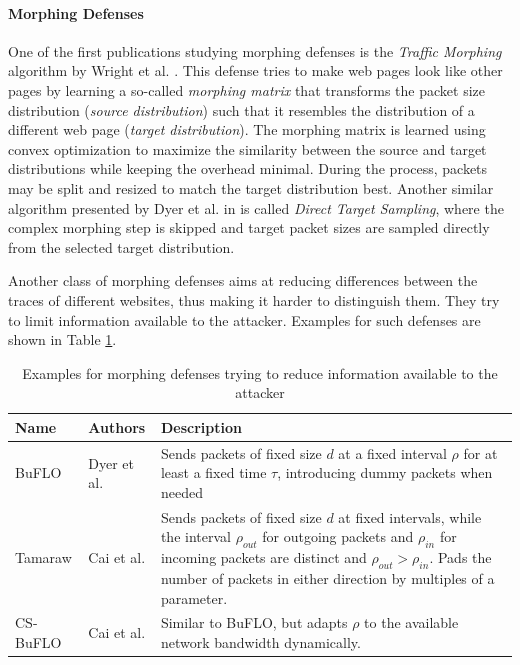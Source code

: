 \documentclass[
	ruledheaders=chapter,
	class=report,
	thesis={type=master, department=inf},
	accentcolor=1c,
	custommargins=true,
	marginpar=false,
	parskip=half-,
	fontsize=11pt,
]{tudapub}
\begin{document}
	\paragraph{Morphing Defenses} One of the first publications studying morphing defenses is the \textit{Traffic Morphing} algorithm by Wright et al. \cite{Wright2009}. This defense tries to make web pages look like other pages by learning a so-called \textit{morphing matrix} that transforms the packet size distribution (\textit{source distribution}) such that it resembles the distribution of a different web page (\textit{target distribution}). The morphing matrix is learned using convex optimization to maximize the similarity between the source and target distributions while keeping the overhead minimal. During the process, packets may be split and resized to match the target distribution best. Another similar algorithm presented by Dyer et al. in \cite{Dyer2012} is called \textit{Direct Target Sampling}, where the complex morphing step is skipped and target packet sizes are sampled directly from the selected target distribution.
	
	Another class of morphing defenses aims at reducing differences between the traces of different websites, thus making it harder to distinguish them. They try to limit information available to the attacker. Examples for such defenses are shown in Table \ref{tbl:morphing}.
	
	\begin{table}
		\centering
		\begin{tabularx}{\textwidth}{|l|l|X|}
			\hline \textbf{Name} & \textbf{Authors} & \textbf{Description} \\
			\hline BuFLO & Dyer et al. \cite{Dyer2012} & Sends packets of fixed size $d$ at a fixed interval $\rho$ for at least a fixed time $\tau$, introducing dummy packets when needed \\
			\hline Tamaraw & Cai et al. \cite{Cai2014} & Sends packets of fixed size $d$ at fixed intervals, while the interval $\rho_{out}$ for outgoing packets and $\rho_{in}$ for incoming packets are distinct and $\rho_{out} > \rho_{in}$. Pads the number of packets in either direction by multiples of a parameter. \cite{Cherubin2017} \\
			\hline CS-BuFLO & Cai et al. \cite{Cai2014a} & Similar to BuFLO, but adapts $\rho$ to the available network bandwidth dynamically. \\
			\hline
		\end{tabularx}
		\caption{Examples for morphing defenses trying to reduce information available to the attacker}
		\label{tbl:morphing}
	\end{table}
			
\end{document}
